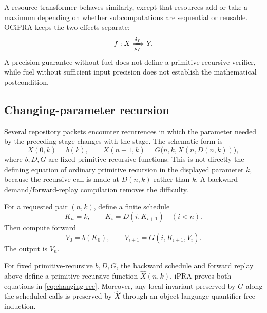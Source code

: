 A resource transformer behaves similarly, except that resources add or take a maximum depending on whether subcomputations are sequential or reusable.  OCiPRA keeps the two effects separate:
\[
  f:X\xRightarrow[\rho_f]{\delta_f}Y.
\]
A precision guarantee without fuel does not define a primitive-recursive verifier, while fuel without sufficient input precision does not establish the mathematical postcondition.

\subsection{Changing-parameter recursion}

Several repository packets encounter recurrences in which the parameter needed by the preceding stage changes with the stage.  The schematic form is
\begin{equation}\label{eq:changing-rec}
 X(0,k)=b(k),\qquad
 X(n+1,k)=G\bigl(n,k,X(n,D(n,k))\bigr),
\end{equation}
where $b,D,G$ are fixed primitive-recursive functions.  This is not directly the defining equation of ordinary primitive recursion in the displayed parameter $k$, because the recursive call is made at $D(n,k)$ rather than $k$.  A backward-demand/forward-replay compilation removes the difficulty.

For a requested pair $(n,k)$, define a finite schedule
\[
 K_n=k,\qquad K_i=D(i,K_{i+1})\quad(i<n).
\]
Then compute forward
\[
 V_0=b(K_0),\qquad
 V_{i+1}=G(i,K_{i+1},V_i).
\]
The output is $V_n$.

\begin{theorem}\label{thm:changing-rec}
For fixed primitive-recursive $b,D,G$, the backward schedule and forward replay above define a primitive-recursive function $\widehat X(n,k)$.  iPRA proves both equations in \eqref{eq:changing-rec}.  Moreover, any local invariant preserved by $G$ along the scheduled calls is preserved by $\widehat X$ through an object-language quantifier-free induction.
\end{theorem}

